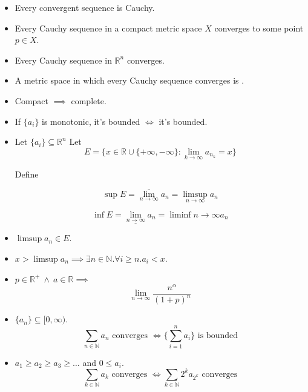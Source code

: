\documentclass[a4paper]{article}
\newcommand{\nat}{\mathbb{N}}
\newcommand{\reals}{\mathbb{R}}
\newcommand{\boxinate}[1]{\framebox[1.1\width]{#1}}
\newcommand{\tand}{~\land~}
\begin{document}
\begin{itemize}
\item Every convergent sequence is Cauchy.

\item Every Cauchy sequence in a compact metric space $X$ converges to some point $p \in X$.

\item Every Cauchy sequence in $\reals^n$ converges.

\item A metric space in which every Cauchy sequence converges is \boxinate{complete}.

\item Compact $\implies$ complete.

\item If $\{a_i\}$ is monotonic, it's bounded $\iff$ it's bounded.

\item Let $\{a_i\} \subseteq \reals^n$ Let
  $$E = \{x \in \reals \cup \{+\infty, -\infty\} : \lim_{k\rightarrow \infty} a_{n_k} = x\}$$

  Define

  $$\sup E = \overline{\lim_{n\rightarrow\infty}} a_n = \limsup_{n\rightarrow \infty} a_n$$

  $$\inf E = \underline{\lim_{n\rightarrow\infty}} a_n = \liminf{n\rightarrow \infty} a_n$$

\item $\limsup a_n \in E$.

\item $x > \limsup a_n \implies \exists n \in \nat . \forall i \geq n . a_i < x$.

\item $p \in \reals^+ \tand a \in \reals \implies$
  $$\lim_{n \rightarrow \infty} \frac{n^\alpha}{(1+p)^n}$$

\item $\{a_n\} \subseteq [0, \infty)$.
  $$\sum_{n \in \nat} a_n\text{ converges }\iff \{\sum_{i=1}^n a_i\} \text{ is bounded}$$

\item $a_1 \geq a_2 \geq a_3 \geq \ldots$ and $0 \leq a_i$.
  $$\sum_{k \in \nat} a_k \text{ converges } \iff \sum_{k \in \nat} 2^k a_{2^k} \text{ converges}$$

\end{itemize}

\end{document}
